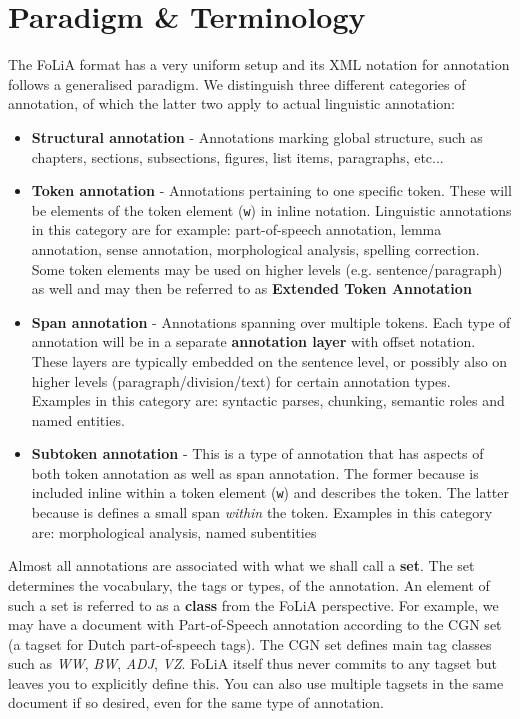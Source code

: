 \documentclass[a4paper,12pt]{report}
\begin{document}
    

\section{Paradigm \& Terminology}
\label{sec:paradigm}

The FoLiA format has a very uniform setup and its XML notation for annotation follows a generalised paradigm. We distinguish three different categories of annotation, of which the latter two apply to actual linguistic annotation:

\begin{itemize}
\item \textbf{Structural annotation} - Annotations marking global structure, such as chapters, sections, subsections, figures, list items, paragraphs, etc...
\item \textbf{Token annotation} - Annotations pertaining to one specific token. These will be elements of the token element (\texttt{w}) in inline notation. Linguistic annotations in this category are for example: part-of-speech annotation, lemma annotation, sense annotation, morphological analysis, spelling correction. Some token elements may be used on higher levels (e.g. sentence/paragraph) as well and may then be referred to as \textbf{Extended Token Annotation}
\item \textbf{Span annotation} - Annotations spanning over multiple tokens. Each type of annotation will be in a separate \textbf{annotation layer} with offset notation. These layers are typically embedded on the sentence level, or possibly also on higher levels (paragraph/division/text) for certain annotation types. Examples in this category are: syntactic parses, chunking, semantic roles and named entities.
\item \textbf{Subtoken annotation} - This is a type of annotation that has aspects of both token annotation as well as span annotation. The former because is included inline within a token element (\texttt{w}) and describes the token. The latter because is defines a small span \emph{within} the token. Examples in this category are: morphological analysis, named subentities 
\end{itemize}

Almost all annotations are associated with what we shall call a \textbf{set}. The set determines the vocabulary, the tags or types, of the annotation. An element of such a set is referred to as a \textbf{class} from the FoLiA perspective. For example, we may have a document with Part-of-Speech annotation according to the CGN set (a tagset for Dutch part-of-speech tags). The CGN set defines main tag classes such as \emph{WW}, \emph{BW}, \emph{ADJ}, \emph{VZ}. FoLiA itself thus never commits to any tagset but leaves you to explicitly define this. You can also use multiple tagsets in the same document if so desired, even for the same type of annotation.
\end{document}
